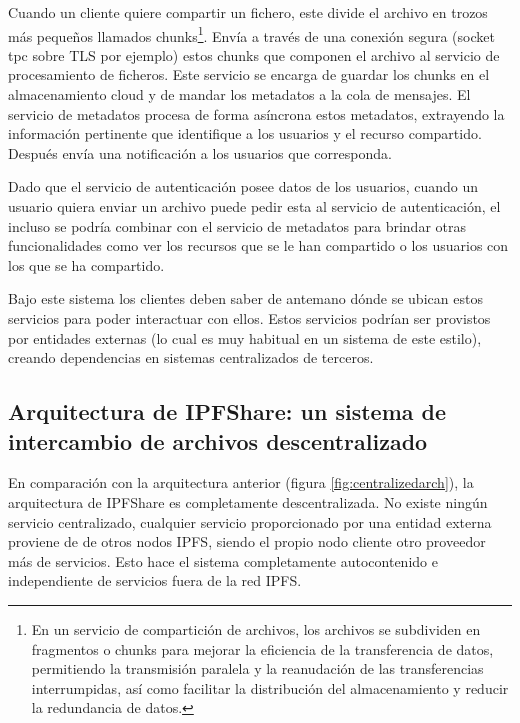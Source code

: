 Cuando un cliente quiere compartir un fichero, este divide el archivo en trozos más pequeños llamados chunks\footnote{En un servicio de compartición de archivos, los archivos se subdividen en fragmentos o chunks para mejorar la eficiencia de la transferencia de datos, permitiendo la transmisión paralela y la reanudación de las transferencias interrumpidas, así como facilitar la distribución del almacenamiento y reducir la redundancia de datos.}.
Envía a través de una conexión segura (socket tpc sobre TLS por ejemplo) estos chunks que componen el archivo al servicio de procesamiento de ficheros.
Este servicio se encarga de guardar los chunks en el almacenamiento cloud y de mandar los metadatos a la cola de mensajes.
El servicio de metadatos procesa de forma asíncrona estos metadatos, extrayendo la información pertinente que identifique
a los usuarios y el recurso compartido. Después envía una notificación a los usuarios que corresponda.

Dado que el servicio de autenticación posee datos de los usuarios, cuando un usuario quiera enviar un archivo puede
pedir esta al servicio de autenticación, el incluso se podría combinar con el servicio de metadatos para brindar otras funcionalidades como ver los recursos que se le han compartido o los usuarios con los que se ha compartido.

Bajo este sistema los clientes deben saber de antemano dónde se ubican estos servicios para poder interactuar con
ellos. Estos servicios podrían ser provistos por entidades externas (lo cual es muy habitual en un sistema de este estilo), creando dependencias en
sistemas centralizados de terceros.
\subsection{Arquitectura de IPFShare: un sistema de intercambio de archivos descentralizado}
En comparación con la arquitectura anterior (figura \ref{fig:centralizedarch}), la arquitectura de IPFShare es
completamente descentralizada. No existe ningún servicio centralizado, cualquier servicio proporcionado por una entidad externa proviene de
de otros nodos IPFS, siendo el propio nodo cliente otro proveedor más de servicios. Esto hace el sistema completamente autocontenido e independiente de servicios fuera
de la red IPFS.

